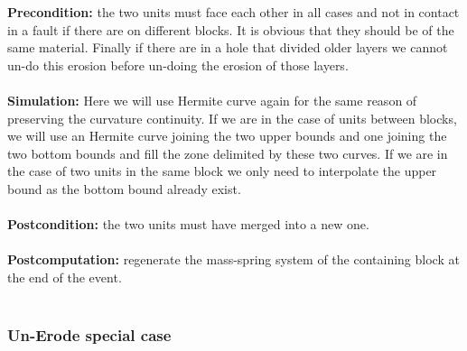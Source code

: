 \documentclass[12pt, a4paper]{report} %
\begin{document}
\textbf{Precondition:} the two units must face each other in all cases and not in contact in a fault if there are on different blocks. It is obvious that they should be of the same material. Finally if there are in a hole that divided older layers we cannot un-do this erosion before un-doing the erosion of those layers.\\\\
\textbf{Simulation:} Here we will use Hermite curve again for the same reason of preserving the curvature continuity. If we are in the case of units between blocks, we will use an Hermite curve joining the two upper bounds and one joining the two bottom bounds and fill the zone delimited by these two curves. If we are in the case of two units in the same block we only need to interpolate the upper bound as the bottom bound already exist.\\\\
\textbf{Postcondition:} the two units must have merged into a new one.\\\\
\textbf{Postcomputation:} regenerate the mass-spring system of the containing block at the end of the event.\\\\
\subsubsection{Un-Erode special case}
\end{document}
